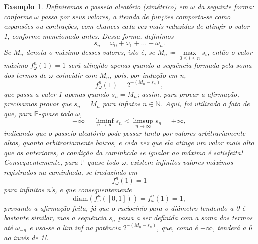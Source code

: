 \documentclass[12pt, a4paper]{article}
\newtheorem{example}{\underline{Exemplo}}
\theoremstyle{definition}
\begin{document}
\begin{example}
	Definiremos o passeio aleatório (simétrico) em \(\omega \) da seguinte forma: conforme \(\omega \) passa por seus valores, a iterada de funções comporta-se como expansões ou contrações, com chances cada vez mais reduzidas de atingir o valor 1, conforme mencionado antes. Dessa forma, definimos
	\[
		s_{n}= \omega_{0}+\omega_{1}+\dotsc +\omega_{n}.
	\]
	Se \(M_{n}\) denota o máximo desses valores, isto é, se \(M_{n}\coloneqq \max\limits_{0\leq i\leq n}s_{i}\), então o valor máximo \(f_{\omega }^{n}(1)=1\) será atingido apenas quando a sequência formada pela soma dos termos de \(\omega \) coincidir com \(M_{n}\), pois, por indução em n,
	\[
		f_{\omega }^{n}(1) = 2^{-(M_{n}-s_{n})},
	\]
	que passa a valer 1 apenas quando \(s_{n}=M_{n}\); assim, para provar a afirmação, precisamos provar que \(s_{n}=M_{n}\) para infintos \(n\in \mathbb{N}\). Aqui, foi utilizado o fato de que, para \(\mathbb{P}\)-quase todo \(\omega \),
	\[
		-\infty=\liminf_{n\to \infty}s_{n} < \limsup_{n\to \infty}s_{n}=+\infty,
	\]
	indicando que o passeio aleatório pode passar tanto por valores arbitrariamente altos, quanto arbitrariamente baixos, e cada vez que ela atinge um valor mais alto que os anteriores, a condição da caminhada se igualar ao máximo é satisfeita! Consequentemente, para \(\mathbb{P}\)-quase todo \(\omega \), existem infinitos valores máximos registrados na caminhada, se traduzindo em
	\[
		f_{\omega }^{n}(1)=1
	\]
	para infinitos n's, e que consequentemente
	\[
		\mathrm{diam}(f_{\omega }^{n}([0,1])) = f_{\omega }^{n}(1)=1,
	\]
	provando a afirmação feita, já que o raciocínio para o diâmetro tendendo a 0 é bastante similar, mas a sequência \(s_{n}\) passa a ser definida com a soma dos termos até \(\omega_{-n}\) e usa-se o lim inf na potência \(2^{-(M_{n}-s_{n})}\), que, como é \(-\infty\), tenderá a 0 ao invés de 1!.
\end{example}
\end{document}
